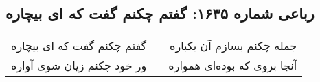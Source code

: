 \begin{center}
\section*{رباعی شماره ۱۶۳۵: گفتم چکنم گفت که ای بیچاره}
\label{sec:1635}
\begin{longtable}{l p{0.5cm} r}
گفتم چکنم گفت که ای بیچاره
&&
جمله چکنم بسازم آن یکباره
\\
ور خود چکنم زیان شوی آواره
&&
آنجا بروی که بوده‌ای همواره
\\
\end{longtable}
\end{center}
